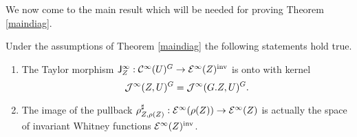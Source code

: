 We now come to the main result which will be needed for proving Theorem \ref{maindiag}. 
\begin{proposition} \label{surgrpd} 
Under the assumptions of Theorem \ref{maindiag}  the following statements hold true.
\begin{enumerate}
\item \label{surJgrpd} The Taylor morphism $\mathsf{J}^\infty_{Z}: \mathcal{C}^\infty(U)^G\to 
\mathcal{E}^\infty(Z)^\textup{inv}$ is onto with kernel 
\[
 \mathcal{J}^\infty(Z,U)^G=\mathcal{J}^\infty(G.Z,U)^G .
\]
\item \label{surpbgrpd} The image of the pullback 
$\rho^{\sharp}_{Z,\rho(Z)}:\mathcal{E}^\infty(\rho(Z))\to \mathcal{E}^\infty(Z)$ 
is actually the space of invariant Whitney functions $\mathcal{E}^\infty(Z)^\textup{inv}$.
\end{enumerate}
\end{proposition}

